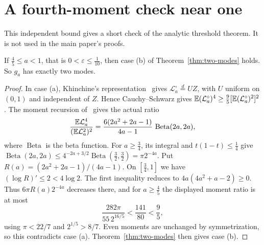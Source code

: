 \section{A fourth-moment check near one}
This independent bound gives a short check of the analytic threshold
theorem. It is not used in the main paper's proofs.

\begin{theorem}\label{thm:two-modes-near-one}
If $\frac45\le a<1$, that is $0<\varepsilon\le\frac1{10}$, then case (b)
of Theorem~\ref{thm:two-modes} holds. So $g_a$ has exactly two modes.
\end{theorem}

\begin{proof}
In case (a), Khinchine's representation~\cite{dj1988} gives
$\mathcal L^\circ_a\overset{d}=UZ$, with $U$ uniform on $(0,1)$ and
independent of $Z$. Hence Cauchy--Schwarz gives
$\mathbb{E}(\mathcal L^\circ_a)^4\ge\frac95[\mathbb{E}(\mathcal L^\circ_a)^2]^2$.
The moment recursion of~\cite[Theorem~1.4]{glr2026} gives the actual ratio
\[
 \frac{\mathbb{E}\mathcal L_a^4}{(\mathbb{E}\mathcal L_a^2)^2}
 =\frac{6(2a^2+2a-1)}{4a-1}\,\operatorname{Beta}(2a,2a),
\]
where $\operatorname{Beta}$ is the beta function. For $a\ge\frac34$, its integral and
$t(1-t)\le\frac14$ give
$\operatorname{Beta}(2a,2a)\le4^{-2a+3/2}\operatorname{Beta}(\frac32,\frac32)=\pi2^{-4a}$.
Put $R(a)=(2a^2+2a-1)/(4a-1)$. On $[\frac34,1]$ we have
$(\log R)'\le2<4\log2$. The first inequality reduces to
$4a(4a^2+a-2)\ge0$. Thus $6\pi R(a)2^{-4a}$ decreases there, and for
$a\ge\frac45$ the displayed moment ratio is at most
\[
 \frac{282\pi}{55\,2^{16/5}}
 <\frac{141}{80}<\frac95,
\]
using $\pi<22/7$ and $2^{1/5}>8/7$. Even moments are unchanged by
symmetrization, so this contradicts case (a). Theorem~\ref{thm:two-modes}
then gives case (b).
\end{proof}
